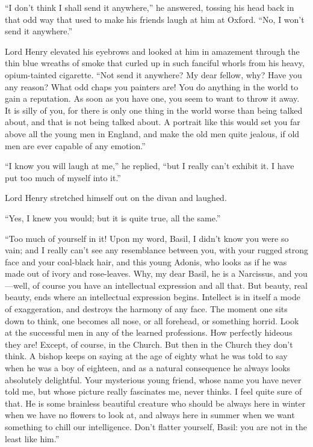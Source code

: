 “I don’t think I shall send it anywhere,” he answered, tossing his head back in that odd way that used to make his friends laugh at him at Oxford. “No, I won’t send it anywhere.”

Lord Henry elevated his eyebrows and looked at him in amazement through the thin blue wreaths of smoke that curled up in such fanciful whorls from his heavy, opium-tainted cigarette. “Not send it anywhere? My dear fellow, why? Have you any reason? What odd chaps you painters are! You do anything in the world to gain a reputation. As soon as you have one, you seem to want to throw it away. It is silly of you, for there is only one thing in the world worse than being talked about, and that is not being talked about. A portrait like this would set you far above all the young men in England, and make the old men quite jealous, if old men are ever capable of any emotion.”

“I know you will laugh at me,” he replied, “but I really can’t exhibit it. I have put too much of myself into it.”

Lord Henry stretched himself out on the divan and laughed.

“Yes, I knew you would; but it is quite true, all the same.”

“Too much of yourself in it! Upon my word, Basil, I didn’t know you were so vain; and I really can’t see any resemblance between you, with your rugged strong face and your coal-black hair, and this young Adonis, who looks as if he was made out of ivory and rose-leaves. Why, my dear Basil, he is a Narcissus, and you—well, of course you have an intellectual expression and all that. But beauty, real beauty, ends where an intellectual expression begins. Intellect is in itself a mode of exaggeration, and destroys the harmony of any face. The moment one sits down to think, one becomes all nose, or all forehead, or something horrid. Look at the successful men in any of the learned professions. How perfectly hideous they are! Except, of course, in the Church. But then in the Church they don’t think. A bishop keeps on saying at the age of eighty what he was told to say when he was a boy of eighteen, and as a natural consequence he always looks absolutely delightful. Your mysterious young friend, whose name you have never told me, but whose picture really fascinates me, never thinks. I feel quite sure of that. He is some brainless beautiful creature who should be always here in winter when we have no flowers to look at, and always here in summer when we want something to chill our intelligence. Don’t flatter yourself, Basil: you are not in the least like him.”

